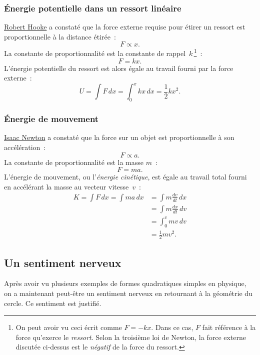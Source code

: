     \subsubsection{Énergie potentielle dans un ressort linéaire} %
    \label{sec:potential_energy_in_a_linear_spring}

\href{https://fr.wikipedia.org/wiki/Robert_Hooke}{Robert Hooke} a constaté que la force externe requise pour étirer un ressort est proportionnelle à la distance étirée~:
\[ F \propto x. \]
La constante de proportionnalité est la constante de rappel~$k$\,\footnote{On peut avoir vu ceci écrit comme $F=-kx$. Dans ce cas, $F$ fait référence à la force qu'exerce le \emph{ressort}. Selon la troisième loi de Newton, la force externe discutée ci-dessus est le \emph{négatif} de la force du ressort.}~:
\[ F = k x. \]
L'énergie potentielle du ressort est alors égale au travail fourni par la force externe~:
\[ U = \int F\,dx = \int_0^x kx\,dx = \textstyle{\frac{1}{2}} kx^2. \]

    \subsubsection{Énergie de mouvement} %
    \label{sec:energy_of_motion}

\href{https://fr.wikipedia.org/wiki/Isaac_Newton}{Isaac Newton} a constaté que la force sur un objet est proportionnelle à son accélération~:
\[ F \propto a. \]
La constante de proportionnalité est la masse $m$~:
\[ F = m a. \]
L'énergie de mouvement, ou l'\emph{énergie cinétique}, est égale au travail total fourni en accélérant la masse au vecteur vitesse~$v$~:
\[
\begin{split}
K = \int F\,dx = \int ma\,dx & = \int m\frac{dv}{dt}\,dx \\ & = \int m\frac{dx}{dt}\,dv \\ & = \int_0^v mv\,dv \\ & = \textstyle{\frac{1}{2}} mv^2.
\end{split}
\]

  \subsection{Un sentiment nerveux} %
  \label{sec:a_sense_of_foreboding}

Après avoir vu plusieurs exemples de formes quadratiques simples en physique, on a maintenant peut-être un sentiment nerveux en retournant à la géométrie du cercle. Ce sentiment est justifié.

